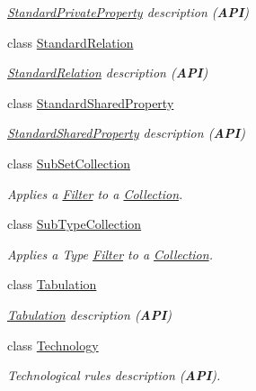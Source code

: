 \begin{DoxyCompactItemize}
\begin{DoxyCompactList}\small\item\em \hyperlink{classHurricane_1_1StandardPrivateProperty}{Standard\+Private\+Property} description ({\bfseries A\+PI}) \end{DoxyCompactList}\item 
class \hyperlink{classHurricane_1_1StandardRelation}{Standard\+Relation}
\begin{DoxyCompactList}\small\item\em \hyperlink{classHurricane_1_1StandardRelation}{Standard\+Relation} description ({\bfseries A\+PI}) \end{DoxyCompactList}\item 
class \hyperlink{classHurricane_1_1StandardSharedProperty}{Standard\+Shared\+Property}
\begin{DoxyCompactList}\small\item\em \hyperlink{classHurricane_1_1StandardSharedProperty}{Standard\+Shared\+Property} description ({\bfseries A\+PI}) \end{DoxyCompactList}\item 
class \hyperlink{classHurricane_1_1SubSetCollection}{Sub\+Set\+Collection}
\begin{DoxyCompactList}\small\item\em Applies a \hyperlink{classHurricane_1_1Filter}{Filter} to a \hyperlink{classHurricane_1_1Collection}{Collection}. \end{DoxyCompactList}\item 
class \hyperlink{classHurricane_1_1SubTypeCollection}{Sub\+Type\+Collection}
\begin{DoxyCompactList}\small\item\em Applies a Type \hyperlink{classHurricane_1_1Filter}{Filter} to a \hyperlink{classHurricane_1_1Collection}{Collection}. \end{DoxyCompactList}\item 
class \hyperlink{classHurricane_1_1Tabulation}{Tabulation}
\begin{DoxyCompactList}\small\item\em \hyperlink{classHurricane_1_1Tabulation}{Tabulation} description ({\bfseries A\+PI}) \end{DoxyCompactList}\item 
class \hyperlink{classHurricane_1_1Technology}{Technology}
\begin{DoxyCompactList}\small\item\em Technological rules description ({\bfseries A\+PI}). \end{DoxyCompactList}\item 

\end{DoxyCompactItemize}
